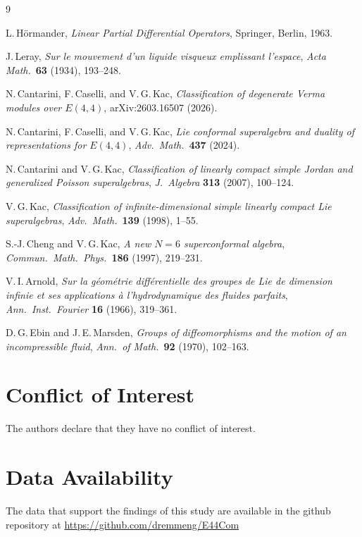 \documentclass[reqno,10pt]{amsart}
\theoremstyle{definition}
\begin{document}
\begin{thebibliography}{9}

L.\,H\"ormander,
\textit{Linear Partial Differential Operators},
Springer, Berlin, 1963.

J.\,Leray,
\textit{Sur le mouvement d'un liquide visqueux emplissant l'espace},
\textit{Acta Math.}\ \textbf{63} (1934), 193--248.

N.\,Cantarini, F.\,Caselli, and V.\,G.\,Kac,
\textit{Classification of degenerate Verma modules over $E(4,4)$},
arXiv:2603.16507 (2026).

N.\,Cantarini, F.\,Caselli, and V.\,G.\,Kac,
\textit{Lie conformal superalgebra and duality of representations for $E(4,4)$},
\textit{Adv.\ Math.}\ \textbf{437} (2024).

N.\,Cantarini and V.\,G.\,Kac,
\textit{Classification of linearly compact simple Jordan and generalized Poisson
superalgebras},
\textit{J.\ Algebra} \textbf{313} (2007), 100--124.

V.\,G.\,Kac,
\textit{Classification of infinite-dimensional simple linearly compact Lie superalgebras},
\textit{Adv.\ Math.}\ \textbf{139} (1998), 1--55.

S.-J.\,Cheng and V.\,G.\,Kac,
\textit{A new $N=6$ superconformal algebra},
\textit{Commun.\ Math.\ Phys.}\ \textbf{186} (1997), 219--231.

V.\,I.\,Arnold,
\textit{Sur la g\'eom\'etrie diff\'erentielle des groupes de Lie de dimension infinie
et ses applications à l'hydrodynamique des fluides parfaits},
\textit{Ann.\ Inst.\ Fourier} \textbf{16} (1966), 319--361.

D.\,G.\,Ebin and J.\,E.\,Marsden,
\textit{Groups of diffeomorphisms and the motion of an incompressible fluid},
\textit{Ann.\ of Math.}\ \textbf{92} (1970), 102--163.
\end{thebibliography}

\section{Conflict of Interest}
The authors declare that they have no conflict of interest.
\section{Data Availability}
The data that support the findings of this study are available in the
github repository at \url{https://github.com/dremmeng/E44Com}
\end{document}
